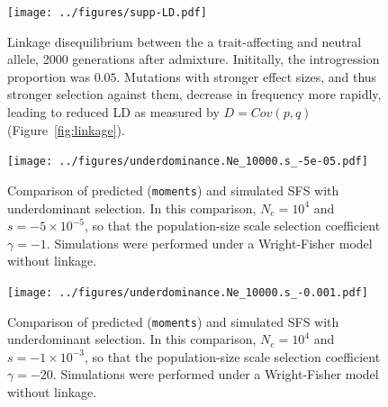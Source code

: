 \documentclass[]{article}
\newcommand{\moments}{\texttt{moments}\xspace}
\begin{document}
\begin{figure}[ht!]
    \centering
    \texttt{[image: ../figures/supp-LD.pdf]}
    \caption{
        Linkage disequilibrium between the a trait-affecting and neutral allele, 
        2000 generations after admixture. Inititally, the introgression proportion
        was $0.05$. Mutations with stronger effect sizes, and thus stronger selection
        against them, decrease in frequency more rapidly, leading to reduced LD
        as measured by $D=Cov(p,q)$ (Figure~\ref{fig:linkage}).
    }
    \label{fig:supp-LD}
\end{figure}

\begin{figure}[ht!]
    \centering
    \texttt{[image: ../figures/underdominance.Ne\_10000.s\_-5e-05.pdf]}
    \caption{
        Comparison of predicted (\moments) and simulated SFS with underdominant
        selection. In this comparison, $N_e=10^4$ and $s=-5\times10^{-5}$, so that
        the population-size scale selection coefficient $\gamma=-1$.
        Simulations were performed under a Wright-Fisher model without linkage.
    }
    \label{fig:underdominance-validation-small-s}
\end{figure}

\begin{figure}[ht!]
    \centering
    \texttt{[image: ../figures/underdominance.Ne\_10000.s\_-0.001.pdf]}
    \caption{
        Comparison of predicted (\moments) and simulated SFS with underdominant
        selection. In this comparison, $N_e=10^4$ and $s=-1\times10^{-3}$, so that
        the population-size scale selection coefficient $\gamma=-20$.
        Simulations were performed under a Wright-Fisher model without linkage.
    }
    \label{fig:underdominance-validation-large-s}
\end{figure}
\end{document}
